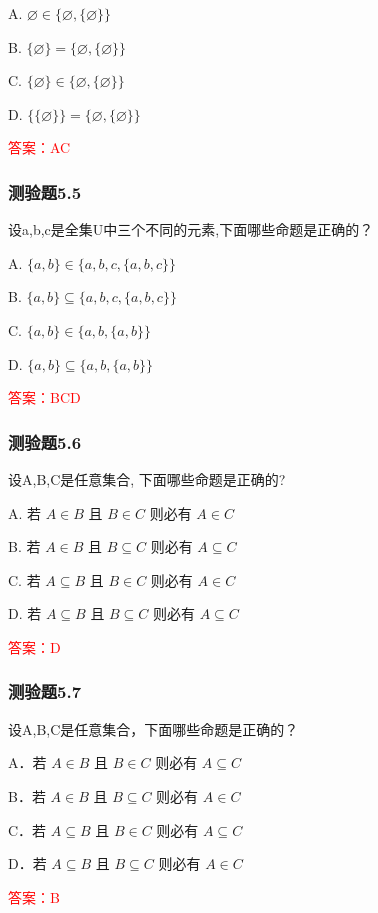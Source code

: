 \documentclass[UTF8, heading=true]{ctexart}
\begin{document}
A. $\varnothing \in\{\varnothing,\{\varnothing\}\}$

B. $\{\varnothing\}=\{\varnothing,\{\varnothing\}\}$

C. $\{\varnothing\} \in\{\varnothing,\{\varnothing\}\}$

D. $\{\{\varnothing\}\}=\{\varnothing,\{\varnothing\}\}$

\textcolor{red}{答案：AC}

\subsubsection{测验题5.5}
设a,b,c是全集U中三个不同的元素,下面哪些命题是正确的？

A. $\{a, b\} \in\{a, b, c,\{a, b, c\}\}$

B. $\{a, b\} \subseteq\{a, b, c,\{a, b, c\}\}$

C. $\{a, b\} \in\{a, b,\{a, b\}\}$

D. $\{a, b\} \subseteq\{a, b,\{a, b\}\}$

\textcolor{red}{答案：BCD}

\subsubsection{测验题5.6}
设A,B,C是任意集合, 下面哪些命题是正确的?

A. 
若 $A \in B$ 且 $B \in C$ 则必有 $A \in C$

B. 
若 $A \in B$ 且 $B \subseteq C$ 则必有 $A \subseteq C$

C. 
若 $A \subseteq B$ 且 $B \in C$ 则必有 $A \in C$

D. 
若 $A \subseteq B$ 且 $B \subseteq C$ 则必有 $A \subseteq C$

\textcolor{red}{答案：D}

\subsubsection{测验题5.7}

设A,B,C是任意集合，下面哪些命题是正确的？

A．若 $A \in B$ 且 $B \in C$ 则必有 $A \subseteq C$

B．若 $A \in B$ 且 $B \subseteq C$ 则必有 $A \in C$

C．若 $A \subseteq B$ 且 $B \in C$ 则必有 $A \subseteq C$

D．若 $A \subseteq B$ 且 $B \subseteq C$ 则必有 $A \in C$

\textcolor{red}{答案：B}
\end{document}
